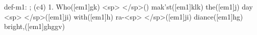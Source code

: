 def-m1: \grealign;
(c4) 1. Who([em1]gk) <sp> </sp>() mak'st([em1]klk) the([em1]j) day <sp> </sp>([em1]ji) with([em1]h) ra-<sp> </sp>([em1]ji) diance([em1]hg) bright,([em1]ghggv)